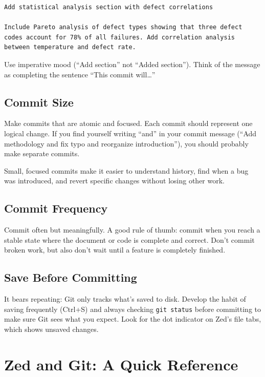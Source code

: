 \documentclass[
  letterpaper,
  DIV=11,
  numbers=noendperiod]{scrreprt}
\begin{document}
\begin{verbatim}
Add statistical analysis section with defect correlations

Include Pareto analysis of defect types showing that three defect
codes account for 78% of all failures. Add correlation analysis
between temperature and defect rate.
\end{verbatim}

Use imperative mood (``Add section'' not ``Added section''). Think of
the message as completing the sentence ``This commit will\ldots{}''

\subsection{Commit Size}\label{commit-size}

Make commits that are atomic and focused. Each commit should represent
one logical change. If you find yourself writing ``and'' in your commit
message (``Add methodology and fix typo and reorganize introduction''),
you should probably make separate commits.

Small, focused commits make it easier to understand history, find when a
bug was introduced, and revert specific changes without losing other
work.

\subsection{Commit Frequency}\label{commit-frequency}

Commit often but meaningfully. A good rule of thumb: commit when you
reach a stable state where the document or code is complete and correct.
Don't commit broken work, but also don't wait until a feature is
completely finished.

\subsection{Save Before Committing}\label{save-before-committing}

It bears repeating: Git only tracks what's saved to disk. Develop the
habit of saving frequently (Ctrl+S) and always checking
\texttt{git\ status} before committing to make sure Git sees what you
expect. Look for the dot indicator on Zed's file tabs, which shows
unsaved changes.

\section{Zed and Git: A Quick
Reference}\label{zed-and-git-a-quick-reference}
\end{document}

